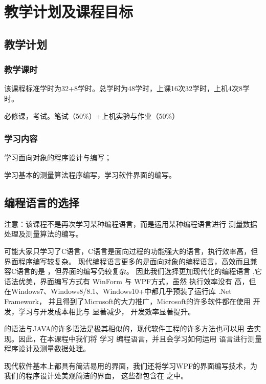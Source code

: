 

\chapter{教学计划及课程目标}

\section*{教学计划}

\subsection*{教学课时}
该课程标准学时为32+8学时。总学时为48学时，上课16次32学时，上机4次8学时。

必修课，考试。笔试（50\%）+上机实验与作业（50\%）

\subsection*{学习内容}

学习面向对象的程序设计与编写；

学习基本的测量算法程序编写，学习软件界面的编写。

\section*{编程语言的选择}

注意：该课程不是再次学习某种编程语言，而是运用某种编程语言进行
测量数据处理及测量算法的编写。

可能大家只学习了C语言，C语言是面向过程的功能强大的语言，执行效率高，但界面程序编写较复杂。
现代编程语言更多的是面向对象的编程语言，高效而且兼容C语言的是 \cpp ，但界面的编写仍较复杂。
因此我们选择更加现代化的编程语言 \cs ,它语法优美，界面编写方式有 WinForm 与 WPF方式，虽然
执行效率没有 \cpp 高，但在Windows7、Windows8/8.1、Windows10+中都几乎预装了运行库 .Net Framework，
并且得到了Microsoft的大力推广，Microsoft的许多软件都在使用 \cs 开发，学习与开发成本相比与 \cpp 显著减少，
开发效率显著提升。

\cs 的语法与JAVA的许多语法是极其相似的，现代软件工程的许多方法也可以用 \cs 去实现。因此，在本课程中我们将
学习 \cs 编程语言，并且会学习如何运用 \cs 语言进行测量程序设计及测量数据处理。

现代软件基本上都具有简洁易用的界面，我们还将学习WPF的界面编写技术，为我们的程序设计处美观简洁的界面，
这些都包含在 \cs 之中。

